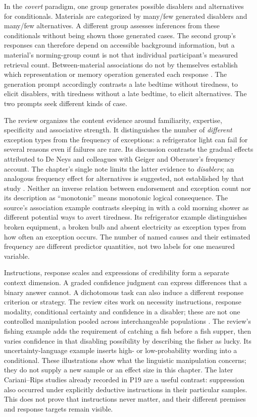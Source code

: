 In the \emph{covert} paradigm, one group generates possible disablers and
alternatives for conditionals. Materials are categorized by many/few
generated disablers and many/few alternatives. A different group assesses
inferences from these conditionals without being shown those generated
cases. The second group's responses can therefore depend on accessible
background information, but a material's norming-group count is not that
individual participant's measured retrieval count. Between-material
associations do not by themselves establish which representation or
memory operation generated each response
\cite[\S2.2]{GazzoCastanedaKnauff2021Defeasible}.
The generation prompt accordingly contrasts a late bedtime without
tiredness, to elicit disablers, with tiredness without a late bedtime,
to elicit alternatives. The two prompts seek different kinds of case.

The review organizes the content evidence around familiarity, expertise,
specificity and associative strength. It distinguishes the number of
\emph{different} exception types from the frequency of exceptions: a
refrigerator light can fail for several reasons even if failures are rare.
Its discussion contrasts the gradual effects attributed to De Neys and
colleagues with Geiger and Oberauer's frequency account. The chapter's
single note limits the latter evidence to \emph{disablers}; an analogous
frequency effect for alternatives is suggested, not established by that
study \cite[\S2.3 and note~1]{GazzoCastanedaKnauff2021Defeasible}.
Neither an inverse relation between endorsement and exception count nor
its description as ``monotonic'' means monotonic logical consequence.
The source's association example contrasts sleeping in with a cold
morning shower as different potential ways to avert tiredness. Its
refrigerator example distinguishes broken equipment, a broken bulb and
absent electricity as exception types from how often an exception occurs.
The number of named causes and their estimated frequency are different
predictor quantities, not two labels for one measured variable.

Instructions, response scales and expressions of credibility form a
separate context dimension. A graded confidence judgment can express
differences that a binary answer cannot. A dichotomous task can also induce
a different response criterion or strategy. The review cites work on
necessity instructions, response modality, conditional certainty and
confidence in a disabler; these are not one controlled manipulation
pooled across interchangeable populations
\cite[\S2.4]{GazzoCastanedaKnauff2021Defeasible}.
The review's fishing example adds the requirement of catching a fish
before a fish supper, then varies confidence in that disabling possibility
by describing the fisher as lucky. Its uncertainty-language example
inserts high- or low-probability wording into a conditional. These
illustrations show what the linguistic manipulation concerns; they do
not supply a new sample or an effect size in this chapter.
The later Cariani--Rips studies already recorded in P19 are a useful
contrast: suppression also occurred under explicitly deductive instructions
in their particular samples. This does not prove that instructions never
matter, and their different premises and response targets remain visible.

